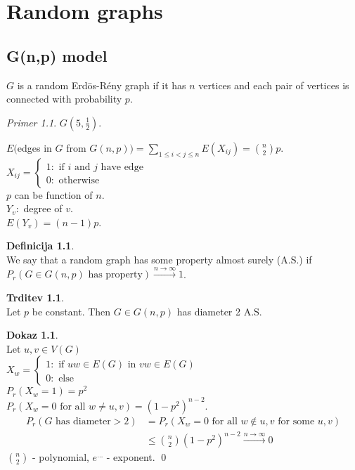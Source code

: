 \documentclass[a4paper, 12pt]{book}
\theoremstyle{definition}
\newtheorem{defn}[counter]{Definicija}
\newtheorem{claim}[counter]{Trditev}
\newtheorem{pro}[counter]{Dokaz}
\theoremstyle{remark}
\newtheorem*{ex}{Primer}
\begin{document}
\chapter{Random graphs}


\section{G(n,p) model}

$G$ is a random Erdös-Rény graph if it has $n$ vertices and each pair of vertices is connected with probability $p$.
\begin{ex}
  $G\left(5, \frac{1}{2}\right)$.
\end{ex}
$E($edges in $G$ from $G(n,p)) = \sum_{1 \leq i < j \leq n} E(X_{ij}) = \binom{n}{2} p$. \\
$X_{ij} = \begin{cases}
  1: \text{ if } i \text{ and } j \text{ have edge} \\
  0: \text{ otherwise}
\end{cases}$ \\
$p$ can be function of $n$. \\
$Y_v:$ degree of $v$. \\
$E(Y_v) = (n-1)p$.
\begin{defn} \text{} \\
  We say that a random graph has some property almost surely (A.S.) if \\
  $P_r(G \in G(n,p) \text{ has property}) \stackrel{n \to \infty}{\longrightarrow} 1$.
\end{defn}
\begin{claim} \text{} \\
  Let $p$ be constant.
  Then $G \in G(n,p)$ has diameter 2 A.S.
\end{claim}
\begin{pro} \text{} \\
  Let $u,v \in V(G)$ \\
  $X_w = \begin{cases}
    1: \text{ if } uw \in E(G) \text{ in } vw \in E(G) \\
    0: \text{ else}
  \end{cases}$ \\
  $P_r(X_w = 1) = p^2$ \\
  $P_r(X_w = 0 \text{ for all } w \neq u,v) = \left(1-p^2\right)^{n-2}$. \\
  \begin{align*}
    P_r(G \text{ has diameter} > 2) &= P_r(X_w = 0 \text{ for all } w \notin u,v  \text{ for some } u,v) \\
    &\leq \binom{n}{2} (1-p^2)^{n-2} \stackrel{n \to \infty}{\longrightarrow} 0
  \end{align*}
  $\binom{n}{2}$ - polynomial, $e^{\dots}$ - exponent.
  \qed
\end{pro}
\end{document}
